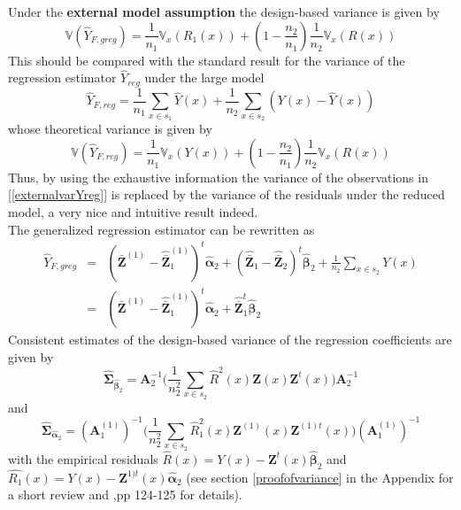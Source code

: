 \documentclass[a4paper,12pt,leqno, titlepage]{article}
\newcommand{\VAR}{\mathbb{V}}
\begin{document}
Under the \textbf{external model assumption} the design-based variance is given by
\begin{equation}\label{externalvarYgreg}
\VAR(\hat{Y}_{F,greg})=\frac{1}{n_1}\VAR_x(R_1(x))+(1-\frac{n_2}{n_1})\frac{1}{n_2}\VAR_x(R(x))
\end{equation}
This should be compared with the standard result for the variance of the regression estimator $\hat{Y}_{reg}$ under the large model
\begin{equation}\label{classicreg}
\hat{Y}_{F,reg}=\frac{1}{n_1}\sum_{x\in{s}_1}\hat{Y}(x)+\frac{1}{n_2}\sum_{x\in{s}_2}(Y(x)-\hat{Y}(x))
\end{equation}
whose theoretical variance is given by
\begin{equation}\label{externalvarYreg}
\VAR(\hat{Y}_{F,reg})=\frac{1}{n_1}\VAR_x(Y(x))+(1-\frac{n_2}{n_1})\frac{1}{n_2}\VAR_x(R(x))
\end{equation}
Thus, by using the exhaustive information the variance of the observations in [\ref{externalvarYreg}] is replaced by the variance of the residuals under the reduced model, a very nice and intuitive result indeed.\\
The generalized regression estimator can be rewritten as
\begin{eqnarray}\label{ygreg2}
\hat{Y}_{F,greg}&=&(\bar{\pmb{Z}}^{(1)}-\hat{\bar{\pmb{Z}}}^{(1)}_1)^t\hat{\pmb{\alpha}}_2 + (\hat{\bar{\pmb{Z}}}_1-\hat{\bar{\pmb{Z}}}_2)^t\hat{\pmb{\beta}}_{2}+\frac{1}{n_2}
\sum_{x\in{s}_2}Y(x) \nonumber \\
&=& (\bar{\pmb{Z}}^{(1)}-\hat{\bar{\pmb{Z}}}^{(1)}_1)^t\hat{\pmb{\alpha}}_2 +
\hat{\bar{\pmb{Z}}}^t_1\hat{\pmb{\beta}}_{2}
\end{eqnarray}
Consistent estimates of the design-based variance of the regression coefficients are given by
\begin{equation}\label{robustvar1}
\hat{\pmb{\Sigma}}_{\hat{\pmb{\beta}}_2}=\pmb{A}_2^{-1}
\Big(\frac{1}{n_2^2}\sum_{x\in{s_2}}\hat{R}^2(x)\pmb{Z}(x)\pmb{Z}^t(x)\Big)\pmb{A}_2^{-1}
\end{equation}
and
\begin{equation}\label{robustvar2}
\hat{\pmb{\Sigma}}_{\hat{\pmb{\alpha}}_2}=(\pmb{A}^{(1)}_1)^{-1}
\Big(\frac{1}{n_2^2}\sum_{x\in{s_2}}\hat{R}_1^2(x)\pmb{Z}^{(1)}(x)\pmb{Z}^{(1)t}(x)\Big)(\pmb{A}^{(1)}_1)^{-1}
\end{equation}
with the empirical residuals $\hat{R}(x)=Y(x)-\pmb{Z}^t(x)\hat{\pmb{\beta}}_{2}$ and $\hat{R_1}(x)=Y(x)-\pmb{Z}^{1)t}(x)\hat{\pmb{\alpha}}_2$ (see section \ref{proofofvariance} in the Appendix for a short review and \cite{mandallaz},pp 124-125 for details).\\
\end{document}

